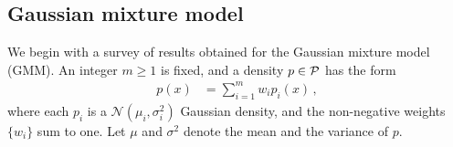 %

\subsection{Gaussian mixture model}
\label{Results}

We begin with a survey of results obtained for the Gaussian mixture model (GMM).  An integer $m\ge 1$ is fixed, and a density $p\in {\cal P}$ has the form
\begin{equation*}
\begin{aligned}
p(x)& = \sum_{i=1}^{m} w_{i} p_{i}(x) \,,
\end{aligned}
\end{equation*}
where each $p_{i}$ is a $\mathcal{N}(\mu_i,\sigma_i^2)$ Gaussian density, and the non-negative weights $\{w_i\}$ sum to one. Let $\mu$ and $\sigma^{2}$ denote the mean and the variance of $p$.
%
%
%

